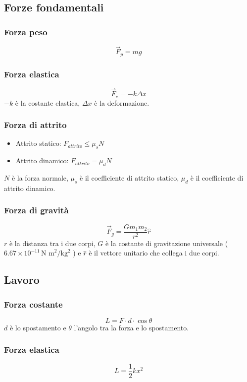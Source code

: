 \documentclass[a4paper]{article}
\theoremstyle{break}
\theoremstyle{break}
\theoremstyle{break}
\theoremstyle{break}
\begin{document}
\subsection{Forze fondamentali}
\subsubsection{Forza peso}
\[
  \vec{F}_p = mg
\]
\subsubsection{Forza elastica}
\[
  \vec{F}_e = -k \Delta x
\]
\( -k \) è la costante elastica, \( \Delta x \) è la deformazione.
\subsubsection{Forza di attrito}
\begin{itemize}
  \item Attrito statico: \( F_{attrito} \leq \mu_s N \)
  \item Attrito dinamico: \( F_{attrito} = \mu_d N \)
\end{itemize}
\( N \) è la forza normale, \( \mu_s \) è il coefficiente di attrito statico, \( \mu_d \) è il coefficiente di attrito dinamico. 

\subsubsection{Forza di gravità}
\[
  \vec{F}_g = \frac{G m_1 m_2}{r^2} \hat{r}
\]
\( r \) è la distanza tra i due corpi, \( G \) è la costante di gravitazione universale (\( 6.67 \times 10^{-11} \, \text{N m}^2 / \text{kg}^2 \) )
e \( \hat{r} \) è il vettore unitario che collega i due corpi.

\subsection{Lavoro}
\subsubsection{Forza costante}
\[
  L = F \cdot d \cdot \cos \theta
\] 
\( d \) è lo spostamento e \( \theta \) l'angolo tra la forza e lo spostamento. 

\subsubsection{Forza elastica}
\[
  L = \frac{1}{2} k x^2
\]
\end{document}
